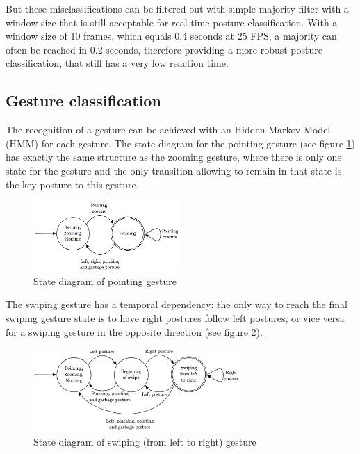 But these misclassifications can be filtered out with simple majority filter with a window size that is still acceptable for real-time posture classification. With a window size of 10 frames, which equals 0.4 seconds at 25 FPS, a majority can often be reached in 0.2 seconds, therefore providing a more robust posture classification, that still has a very low reaction time.

\subsection{Gesture classification}
\label{sub:gesture-classification}

The recognition of a gesture can be achieved with an Hidden Markov Model (HMM) for each gesture. The state diagram for the pointing gesture (see figure \ref{fig:pointing-states}) has exactly the same structure as the zooming gesture, where there is only one state for the gesture and the only transition allowing to remain in that state is the key posture to this gesture. 

\begin{figure}[H]
	\centering
	\includegraphics[width=0.5\textwidth]{images/states-pointing}
	\caption{State diagram of pointing gesture}
	\label{fig:pointing-states}
\end{figure}

The swiping gesture has a temporal dependency: the only way to reach the final swiping gesture state is to have  right postures follow left postures, or vice versa for a swiping gesture in the opposite direction (see figure \ref{fig:swiping-states}).
\begin{figure}[H]
	\centering
	\includegraphics[width=0.7\textwidth]{images/states-swipe}
	\caption{State diagram of swiping (from left to right) gesture}
	\label{fig:swiping-states}
\end{figure}

